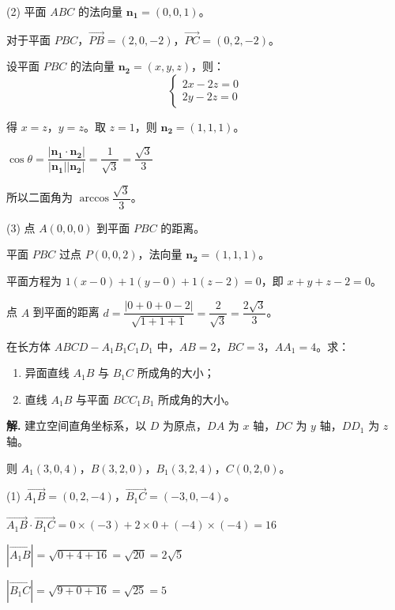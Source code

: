\documentclass[11pt]{ctexrep}
\begin{document}
(2) 平面 $ABC$ 的法向量 $\boldsymbol{n_1} = (0, 0, 1)$。

对于平面 $PBC$，$\overrightarrow{PB} = (2, 0, -2)$，$\overrightarrow{PC} = (0, 2, -2)$。

设平面 $PBC$ 的法向量 $\boldsymbol{n_2} = (x, y, z)$，则：
\[
\begin{cases}
2x - 2z = 0 \\
2y - 2z = 0
\end{cases}
\]

得 $x = z$，$y = z$。取 $z = 1$，则 $\boldsymbol{n_2} = (1, 1, 1)$。

$\cos\theta = \dfrac{|\boldsymbol{n_1} \cdot \boldsymbol{n_2}|}{|\boldsymbol{n_1}||\boldsymbol{n_2}|} = \dfrac{1}{\sqrt{3}} = \dfrac{\sqrt{3}}{3}$

所以二面角为 $\arccos\dfrac{\sqrt{3}}{3}$。

(3) 点 $A(0, 0, 0)$ 到平面 $PBC$ 的距离。

平面 $PBC$ 过点 $P(0, 0, 2)$，法向量 $\boldsymbol{n_2} = (1, 1, 1)$。

平面方程为 $1(x - 0) + 1(y - 0) + 1(z - 2) = 0$，即 $x + y + z - 2 = 0$。

点 $A$ 到平面的距离 $d = \dfrac{|0 + 0 + 0 - 2|}{\sqrt{1 + 1 + 1}} = \dfrac{2}{\sqrt{3}} = \dfrac{2\sqrt{3}}{3}$。

\begin{example}[练习]
    在长方体 $ABCD-A_1B_1C_1D_1$ 中，$AB = 2$，$BC = 3$，$AA_1 = 4$。求：
    \begin{enumerate}
        \item 异面直线 $A_1B$ 与 $B_1C$ 所成角的大小；
        \item 直线 $A_1B$ 与平面 $BCC_1B_1$ 所成角的大小。
    \end{enumerate}
\end{example}

\textbf{解.} 建立空间直角坐标系，以 $D$ 为原点，$DA$ 为 $x$ 轴，$DC$ 为 $y$ 轴，$DD_1$ 为 $z$ 轴。

则 $A_1(3, 0, 4)$，$B(3, 2, 0)$，$B_1(3, 2, 4)$，$C(0, 2, 0)$。

(1) $\overrightarrow{A_1B} = (0, 2, -4)$，$\overrightarrow{B_1C} = (-3, 0, -4)$。

$\overrightarrow{A_1B} \cdot \overrightarrow{B_1C} = 0 \times (-3) + 2 \times 0 + (-4) \times (-4) = 16$

$|\overrightarrow{A_1B}| = \sqrt{0 + 4 + 16} = \sqrt{20} = 2\sqrt{5}$

$|\overrightarrow{B_1C}| = \sqrt{9 + 0 + 16} = \sqrt{25} = 5$
\end{document}
